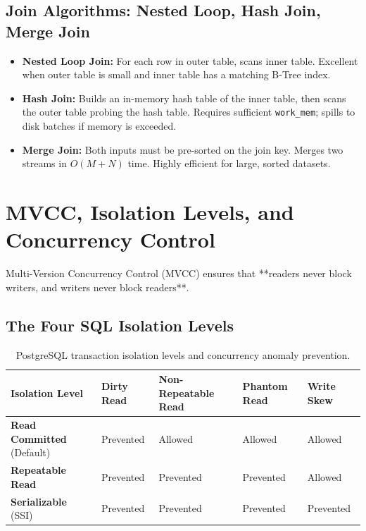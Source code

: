 \subsection{Join Algorithms: Nested Loop, Hash Join, Merge Join}

\begin{itemize}[leftmargin=15pt]
  \item \textbf{Nested Loop Join:} For each row in outer table, scans inner table. Excellent when outer table is small and inner table has a matching B-Tree index.
  \item \textbf{Hash Join:} Builds an in-memory hash table of the inner table, then scans the outer table probing the hash table. Requires sufficient \texttt{work\_mem}; spills to disk batches if memory is exceeded.
  \item \textbf{Merge Join:} Both inputs must be pre-sorted on the join key. Merges two streams in $O(M + N)$ time. Highly efficient for large, sorted datasets.
\end{itemize}

\section{MVCC, Isolation Levels, and Concurrency Control}

Multi-Version Concurrency Control (MVCC) ensures that **readers never block writers, and writers never block readers**.

\subsection{The Four SQL Isolation Levels}

\begin{table}[htbp]
\centering
\small\sffamily
\begin{tabular}{@{}lllll@{}}
\toprule
\textbf{Isolation Level} & \textbf{Dirty Read} & \textbf{Non-Repeatable Read} & \textbf{Phantom Read} & \textbf{Write Skew} \\ \midrule
\textbf{Read Committed} (Default) & Prevented & Allowed & Allowed & Allowed \\
\textbf{Repeatable Read} & Prevented & Prevented & Prevented & Allowed \\
\textbf{Serializable} (SSI) & Prevented & Prevented & Prevented & Prevented \\ \bottomrule
\end{tabular}
\caption{PostgreSQL transaction isolation levels and concurrency anomaly prevention.}
\label{tab:isolation}
\end{table}

